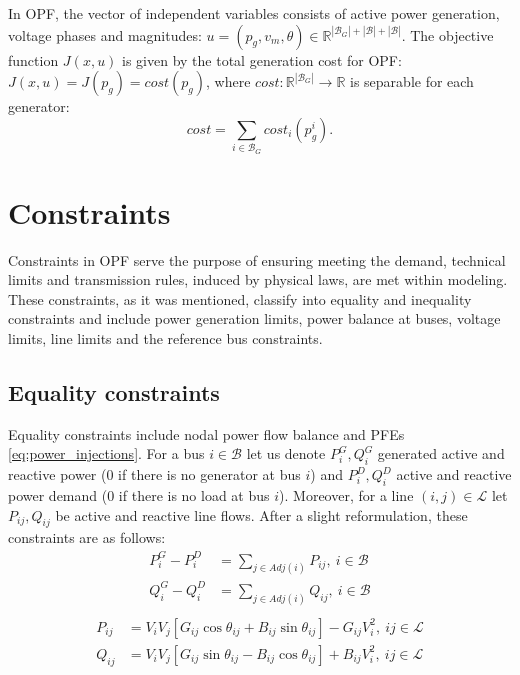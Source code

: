 In OPF, the vector of independent variables consists of active power generation, voltage phases and magnitudes: $u = (p_g, v_m, \theta) \in \mathbb{R}^{|\mathcal{B}_G| + |\mathcal{B}| + |\mathcal{B}|}$. The objective function $J(x, u)$ is given by the total generation cost for OPF: $J(x, u) = J(p_g) = \textit{cost}(p_g)$, where $\textit{cost}: \mathbb{R}^{|\mathcal{B}_G|} \to \mathbb{R}$ is separable for each generator: 
\begin{equation}
\textit{cost} = \sum_{i \in \mathcal{B}_G} \textit{cost}_i (p_g^i).
\label{eq:objective_opf}
\end{equation}

\section{Constraints}

Constraints in OPF serve the purpose of ensuring meeting the demand, technical limits and transmission rules, induced by physical laws, are met within modeling. These constraints, as it was mentioned, classify into equality and inequality constraints and include power generation limits, power balance at buses, voltage limits, line limits and the reference bus constraints.

\subsection{Equality constraints}

Equality constraints include nodal power flow balance and PFEs \eqref{eq:power_injections}. For a bus $i \in \mathcal{B}$ let us denote $P_i^G, Q_i^G$ generated active and reactive power (0 if there is no generator at bus $i$) and $P_i^D, Q_i^D$ active and reactive power demand (0 if there is no load at bus $i$). Moreover, for a line $(i, j) \in \mathcal{L}$ let $P_{ij}, Q_{ij}$ be active and reactive line flows.  After a slight reformulation, these constraints are as follows: %
\begin{equation}
    \begin{aligned}
        P_i^G - P_i^D &= \sum_{j \in \textit{Adj}(i)} P_{ij}, ~i \in \mathcal{B} \\
        Q_i^G - Q_i^D &= \sum_{j \in \textit{Adj}(i)} Q_{ij}, ~i \in \mathcal{B} \\
    \end{aligned}
    \label{eq:nodal_flow}
\end{equation}
\begin{equation}
    \begin{aligned}
        P_{ij} &= V_i V_j \left[ G_{ij} \cos \theta_{ij} + B_{ij} \sin \theta_{ij} \right] - G_{ij} V_i^2, ~ij \in \mathcal{L} \\
        Q_{ij} &= V_i V_j \left[ G_{ij} \sin \theta_{ij} - B_{ij} \cos \theta_{ij} \right] + B_{ij} V_i^2, ~ij \in \mathcal{L} \\
    \end{aligned}
    \label{eq:line_flow}
\end{equation}

